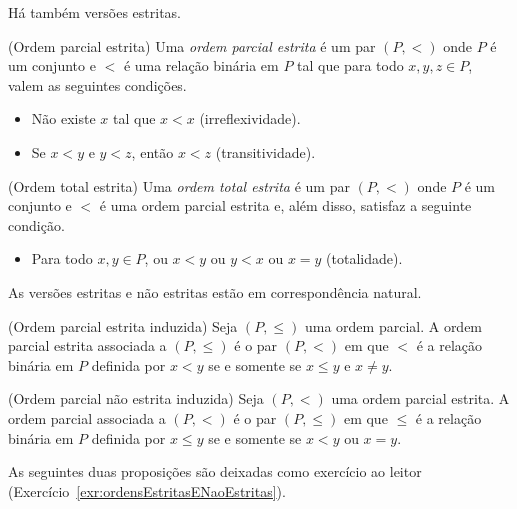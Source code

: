 Há também versões estritas.

\begin{definition}[$\BST$](Ordem parcial estrita)\label{def:ordemParcialEstrita}
    Uma \emph{ordem parcial estrita} é um par $(P, <)$ onde $P$ é um conjunto e $<$ é uma relação binária em $P$ tal que para todo $x, y, z \in P$, valem as seguintes condições.
    \begin{itemize}
        \item Não existe $x$ tal que $x < x$ (irreflexividade).
        \item Se $x < y$ e $y < z$, então $x < z$ (transitividade).
    \end{itemize}
\end{definition}

\begin{definition}[$\BST$](Ordem total estrita)\label{def:ordemTotalEstrita}
    Uma \emph{ordem total estrita} é um par $(P, <)$ onde $P$ é um conjunto e $<$ é uma ordem parcial estrita e, além disso, satisfaz a seguinte condição.
    \begin{itemize}
        \item Para todo $x, y \in P$, ou $x < y$ ou $y < x$ ou $x = y$ (totalidade).
    \end{itemize}
\end{definition}

As versões estritas e não estritas estão em correspondência natural.

\begin{definition}[$\BST$](Ordem parcial estrita induzida)\label{def:ordemParcialEstritaInduzida}
    Seja $(P, \leq)$ uma ordem parcial.
    A ordem parcial estrita associada a $(P, \leq)$ é o par $(P, <)$ em que $<$ é a relação binária em $P$ definida por $x < y$ se e somente se $x \leq y$ e $x \neq y$.
\end{definition}

\begin{definition}[$\BST$](Ordem parcial não estrita induzida)\label{def:ordemParcialInduzida}
    Seja $(P, <)$ uma ordem parcial estrita.
    A ordem parcial associada a $(P, <)$ é o par $(P, \leq)$ em que $\leq$ é a relação binária em $P$ definida por $x \leq y$ se e somente se $x < y$ ou $x = y$.
\end{definition}

As seguintes duas proposições são deixadas como exercício ao leitor (Exercício~\ref{exr:ordensEstritasENaoEstritas}).

